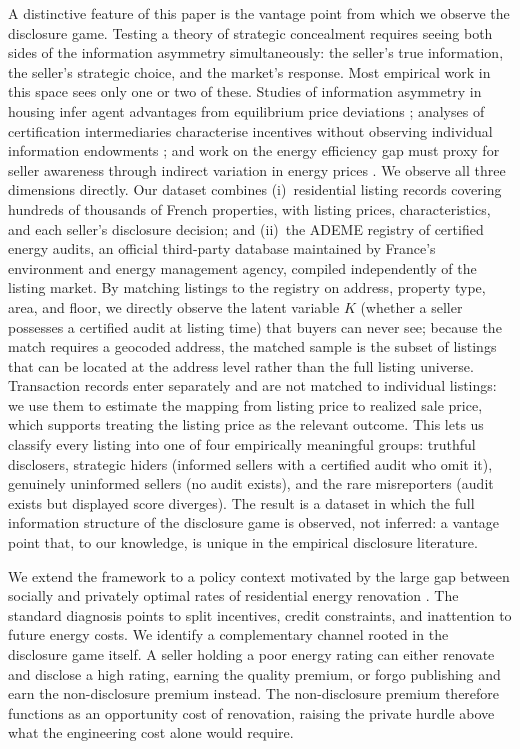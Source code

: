 \documentclass[10pt,letterpaper]{bp-template-concise}
\begin{document}
A distinctive feature of this paper is the vantage point from which we observe the disclosure game. Testing a theory of strategic concealment requires seeing both sides of the information asymmetry simultaneously: the seller's true information, the seller's strategic choice, and the market's response. Most empirical work in this space sees only one or two of these. Studies of information asymmetry in housing infer agent advantages from equilibrium price deviations \citep{levitt_syverson_2008}; analyses of certification intermediaries characterise incentives without observing individual information endowments \citep{lizzeri_1999}; and work on the energy efficiency gap must proxy for seller awareness through indirect variation in energy prices \citep{myers_asymmetric_2020}. We observe all three dimensions directly. Our dataset combines (i)~residential listing records covering hundreds of thousands of French properties, with listing prices, characteristics, and each seller's disclosure decision; and (ii)~the ADEME registry of certified energy audits, an official third-party database maintained by France's environment and energy management agency, compiled independently of the listing market. By matching listings to the registry on address, property type, area, and floor, we directly observe the latent variable $K$ (whether a seller possesses a certified audit at listing time) that buyers can never see; because the match requires a geocoded address, the matched sample is the subset of listings that can be located at the address level rather than the full listing universe. Transaction records enter separately and are not matched to individual listings: we use them to estimate the mapping from listing price to realized sale price, which supports treating the listing price as the relevant outcome. This lets us classify every listing into one of four empirically meaningful groups: truthful disclosers, strategic hiders (informed sellers with a certified audit who omit it), genuinely uninformed sellers (no audit exists), and the rare misreporters (audit exists but displayed score diverges). The result is a dataset in which the full information structure of the disclosure game is observed, not inferred: a vantage point that, to our knowledge, is unique in the empirical disclosure literature.

We extend the framework to a policy context motivated by the large gap between socially and privately optimal rates of residential energy renovation \citep{allcott_is_2012, gerarden_assessing_2017}. The standard diagnosis points to split incentives, credit constraints, and inattention to future energy costs. We identify a complementary channel rooted in the disclosure game itself. A seller holding a poor energy rating can either renovate and disclose a high rating, earning the quality premium, or forgo publishing and earn the non-disclosure premium instead. The non-disclosure premium therefore functions as an opportunity cost of renovation, raising the private hurdle above what the engineering cost alone would require.
\end{document}
